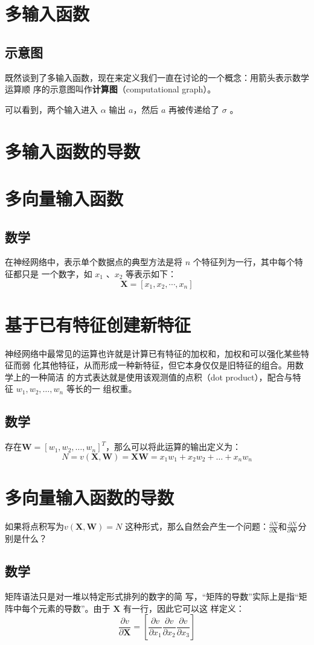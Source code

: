 \section{多输入函数}
\subsection*{示意图}
既然谈到了多输入函数，现在来定义我们一直在讨论的一个概念：用箭头表示数学运算顺
序的示意图叫作\textbf{计算图}（computational graph）。


可以看到，两个输入进入 $\alpha$ 输出 $a$，然后 $a$ 再被传递给了 $\sigma$ 。
\section{多输入函数的导数}
\section{多向量输入函数}
\subsection*{数学}
在神经网络中，表示单个数据点的典型方法是将 $n$ 个特征列为一行，其中每个特征都只是
一个数字，如
$x_1$ 、$x_2$ 等表示如下：
$$\bm{X}=[x_1, x_2, \cdots, x_n]$$
\section{基于已有特征创建新特征}
神经网络中最常见的运算也许就是计算已有特征的加权和，加权和可以强化某些特征而弱
化其他特征，从而形成一种新特征，但它本身仅仅是旧特征的组合。用数学上的一种简洁
的方式表达就是使用该观测值的点积（dot product），配合与特征
$w_1, w_2, \dots, w_n$
等长的一
组权重。

\subsection*{数学}
存在$\bm{W}=[w_1, w_2, \dots, w_n]^T$，那么可以将此运算的输出定义为：
$$N=v(\bm{X}, \bm{W})=\bm{X}\bm{W}=x_1w_1+x_2w_2+\dots+x_nw_n$$
\section{多向量输入函数的导数}
如果将点积写为$v(\bm{X}, \bm{W})=N$
这种形式，那么自然会产生一个问题：$\frac{\partial N}{\partial \bm{X}}$和$\frac{\partial N}{\partial \bm{W}}$分别是什么？
\subsection*{数学}
矩阵语法只是对一堆以特定形式排列的数字的简
写，“矩阵的导数”实际上是指“矩阵中每个元素的导数”。由于 $\bm{X}$ 有一行，因此它可以这
样定义：
\begin{equation*}
    \frac{\partial v}{\partial \bm{X}}=
    \left[
        \frac{\partial v}{\partial x_1}  \frac{\partial v}{\partial x_2}  \frac{\partial v}{\partial x_3}
        \right]
\end{equation*}

